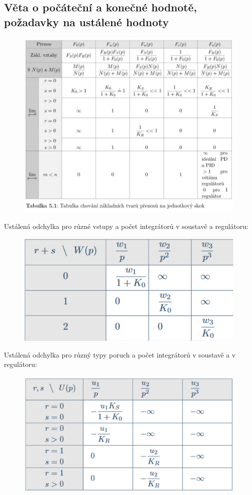 \subsection*{Věta o počáteční a konečné hodnotě, požadavky na ustálené hodnoty}
\begin{figure}[H]
    \includegraphics[scale = 0.8]{images/tvary_prenosu.png}
\end{figure}
Ustálená odchylka pro různé vstupy a počet integrátorů v soustavě a regulátoru:
\begin{figure}[H]
    \includegraphics[scale = 0.3]{images/ustalena_odchylka.png}
\end{figure}
\newpage
Ustálená odchylka pro různý typy poruch a počet integrátorů v soustavě a v regulátoru:
\begin{figure}[H]
    \includegraphics[scale = 0.3]{images/ustalena_odchylka2.png}
\end{figure}
\newpage

